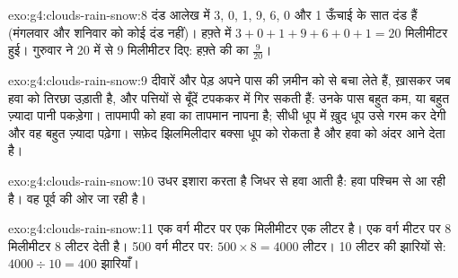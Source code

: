 \begin{solution}{exo:g4:clouds-rain-snow:8}
दंड आलेख में 3, 0, 1, 9, 6, 0 और 1 ऊँचाई के सात दंड हैं (मंगलवार और शनिवार को
कोई दंड नहीं)। हफ़्ते में $3 + 0 + 1 + 9 + 6 + 0 + 1 = 20$ मिलीमीटर  हुई।
गुरुवार ने 20 में से 9 मिलीमीटर दिए: हफ़्ते की  का $\frac{9}{20}$।
\end{solution}

\begin{solution}{exo:g4:clouds-rain-snow:9}
दीवारें और पेड़ अपने पास की ज़मीन को  से बचा लेते हैं, ख़ासकर जब हवा 
को तिरछा उड़ाती है, और पत्तियों से बूँदें टपककर  में गिर सकती हैं: उनके
पास  बहुत कम, या बहुत ज़्यादा पानी पकड़ेगा। तापमापी को हवा का तापमान
नापना है; सीधी धूप में ख़ुद धूप उसे गरम कर देगी और वह बहुत ज़्यादा पढ़ेगा। सफ़ेद
झिलमिलीदार बक्सा धूप को रोकता है और हवा को अंदर आने देता है।
\end{solution}

\begin{solution}{exo:g4:clouds-rain-snow:10}
 उधर इशारा करता है जिधर से हवा आती है: हवा पश्चिम से आ रही है।
वह पूर्व की ओर जा रही है।
\end{solution}

\begin{solution}{exo:g4:clouds-rain-snow:11}
एक वर्ग मीटर पर एक मिलीमीटर  एक लीटर है। एक वर्ग मीटर पर 8 मिलीमीटर
 8 लीटर देती है। 500 वर्ग मीटर पर: $500 \times 8 = 4000$ लीटर। 10 लीटर
की झारियों से: $4000 \div 10 = 400$ झारियाँ।
\end{solution}
